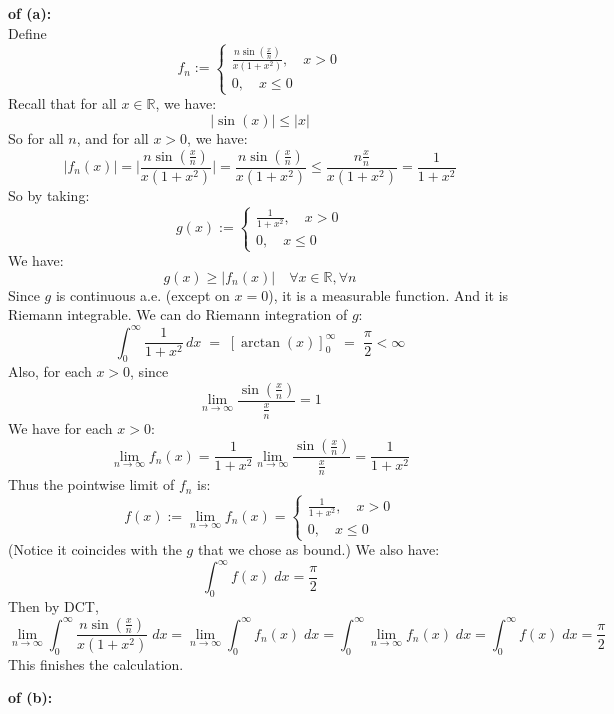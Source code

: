 \documentclass[lang=cn,11pt]{elegantbook}
\begin{document}
\begin{solution}
    \textbf{of (a):}\\
    Define \[
    f_n := \begin{cases}
  \frac{n\sin\left(\frac{x}{n}\right)}{x(1+x^2)}  ,\quad        x > 0\\
  0, \quad x\leq 0
    \end{cases}
    \]
Recall that for all $x  \in \mathbb{R}$, we have: \[
|\sin(x)| \leq |x|
\]
So for all $n$, and for all $x>0$, we have: \[
|f_n (x)| = \Bigg| \frac{n\sin\left(\frac{x}{n}\right)}{x(1+x^2)} \Bigg|  =   \frac{n 
 \sin\left(\frac{x}{n}\right)   }{x(1+x^2)}\leq   
\frac{n \frac{x}{n} }{x(1+x^2)}   = \frac{1}{1+ x^2}
\]
So by taking: \[
g(x) := \begin{cases}
  \frac{1}{1+x^2}  ,\quad        x > 0\\
  0, \quad x\leq 0
    \end{cases}
\]
We have: \[
g(x) \geq |f_n(x)| \quad \forall x\in \mathbb{R}, \forall n
\]
Since $g$ is continuous a.e. (except on $x=0$), it is a measurable function. And it is Riemann integrable. We can do Riemann integration of $g$: \[
\int_{0}^{\infty}
\frac{1}{1 + x^2} \, dx
\;=\;
\left[\arctan(x)\right]_{0}^{\infty}
\;=\;
\frac{\pi}{2} < \infty
\]
Also, for each $x > 0$, since \[
\lim_{n\to \infty} \frac{\sin(\frac{x}{n})}{\frac{x}{n}} = 1
\]
We have for each $x > 0$: \[
\lim_{n \to \infty} f_n(x) = \frac{1}{1+ x^2 } \lim_{n\to \infty} \frac{\sin(\frac{x}{n})}{\frac{x}{n}}   =  \frac{1}{1+ x^2 }
\]
Thus the pointwise limit of $f_n$ is:  \[
f(x):=\lim_{n \to \infty} f_n(x) = \begin{cases}
  \frac{1}{1+x^2}  ,\quad        x > 0\\
  0, \quad x\leq 0
    \end{cases}
\]
(Notice it coincides with the $g$ that we chose as bound.) We also have: 
\[ \int_{0}^{\infty} f(x) \; dx = \frac{\pi}{2}
\]
Then by DCT, 
\[
\lim_{n\to \infty} \int_0^\infty \frac{n\sin\left(\frac{x}{n}\right)}{x(1+x^2)} \; d x =\lim_{n \to \infty} \int_{0}^{\infty} f_n(x) \; dx =\int_{0}^{\infty} \lim_{n\to \infty} f_n(x) \; dx = \int_{0}^{\infty} f(x) \; dx =   \frac{\pi}{2}
\]
This finishes the calculation.
\end{solution}


\begin{solution}
    \textbf{of (b):}\\







    
\end{solution}
\end{document}
